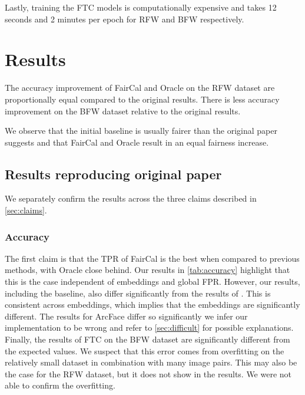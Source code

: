Lastly, training the FTC models is computationally expensive and takes 12 seconds and 2 minutes per epoch for RFW and BFW respectively.

\section{Results}
\label{sec:results}

The accuracy improvement of FairCal and Oracle on the RFW dataset are proportionally equal compared to the original results.
There is less accuracy improvement on the BFW dataset relative to the original results.

We observe that the initial baseline is usually fairer than the original paper suggests and that FairCal and Oracle result in an equal fairness increase.


\subsection{Results reproducing original paper}

We separately confirm the results across the three claims described in \autoref{sec:claims}.

\subsubsection{Accuracy}  %
The first claim is that the TPR of FairCal is the best when compared to previous methods, with Oracle close behind.
Our results in \autoref{tab:accuracy} highlight that this is the case independent of embeddings and global FPR.
However, our results, including the baseline, also differ significantly from the results of \citeauthor{salvador2022faircal}.
This is consistent across embeddings, which implies that the embeddings are significantly different.
The results for ArcFace differ so significantly we infer our implementation to be wrong and refer to \autoref{sec:difficult} for possible explanations. Finally, the results of FTC on the BFW dataset are significantly different from the expected values.
We suspect that this error comes from overfitting on the relatively small dataset in combination with many image pairs.
This may also be the case for the RFW dataset, but it does not show in the results.
We were not able to confirm the overfitting.

